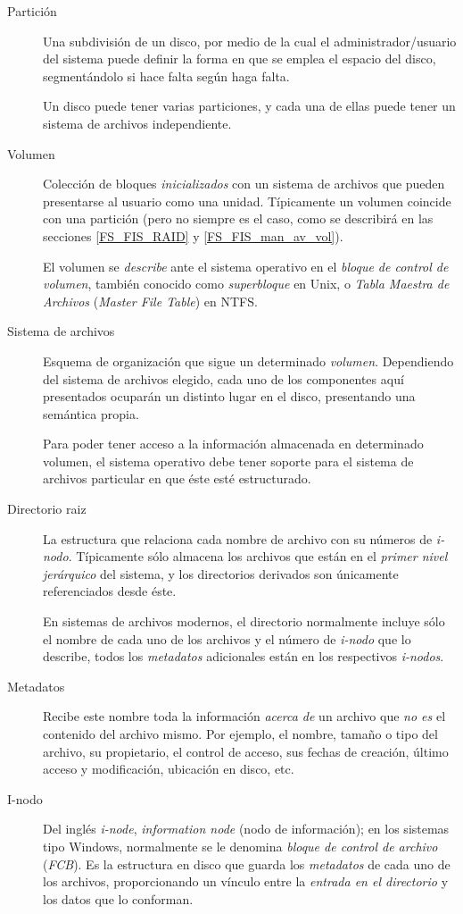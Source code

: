 \documentclass[11pt,fleqn]{book} %
\begin{document}
\begin{description}
\item[Partición] Una subdivisión de un disco, por medio de la cual el
               administrador/usuario del sistema puede definir la
               forma en que se emplea el espacio del disco,
               segmentándolo si hace falta según haga falta.

	       Un disco puede tener varias particiones, y cada una de
               ellas puede tener un sistema de archivos independiente.
\item[Volumen] Colección de bloques \emph{inicializados} con un sistema de
             archivos que pueden presentarse al usuario como una
             unidad. Típicamente un volumen coincide con una partición
             (pero no siempre es el caso, como se describirá en las
             secciones \ref{FS_FIS_RAID} y \ref{FS_FIS_man_av_vol}).

	     El volumen se \emph{describe} ante el sistema operativo en el
             \emph{bloque de control de volumen}, también conocido como
             \emph{superbloque} en Unix, o \emph{Tabla Maestra de Archivos}
             (\emph{Master File Table}) en NTFS.
\item[Sistema de archivos] Esquema de organización que sigue un
     determinado \emph{volumen}. Dependiendo del sistema de archivos
     elegido, cada uno de los componentes aquí presentados ocuparán un
     distinto lugar en el disco, presentando una semántica
     propia.

     Para poder tener acceso a la información almacenada en
     determinado volumen, el sistema operativo debe tener soporte para
     el sistema de archivos particular en que éste esté estructurado.
\item[Directorio raiz] La estructura que relaciona cada nombre
     de archivo con su números de \emph{i-nodo}. Típicamente sólo almacena los
     archivos que están en el \emph{primer nivel jerárquico} del sistema, y
     los directorios derivados son únicamente referenciados desde
     éste.

     En sistemas de archivos modernos, el directorio normalmente
     incluye sólo el nombre de cada uno de
     los archivos y el número de \emph{i-nodo} que lo describe, todos los
     \emph{metadatos} adicionales están en los respectivos \emph{i-nodos}.
\item[Metadatos] Recibe este nombre toda la información \emph{acerca de} un
               archivo que \emph{no es} el contenido del archivo mismo. Por ejemplo, el
               nombre, tamaño o tipo del archivo, su propietario, el
               control de acceso, sus fechas de creación, último
               acceso y modificación, ubicación en disco, etc.
\item[I-nodo] Del inglés \emph{i-node}, \emph{information node} (nodo de
            información); en los sistemas tipo Windows, normalmente se
            le denomina \emph{bloque de control de archivo} (\emph{FCB}). Es la
            estructura en disco que guarda los \emph{metadatos} de cada uno
            de los archivos, proporcionando un vínculo entre la
            \emph{entrada en el directorio} y los datos que lo conforman.


\end{description}
\end{document}
